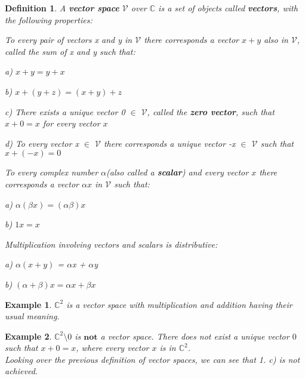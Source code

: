 \documentclass[12pt,a4paper]{article}
\newtheorem{defn}[thm]{Definition}
\newtheorem{exmp}{Example}[section]
\begin{document}
\begin{defn} A \textbf{vector space} $\mathcal{V}$ over $\mathbb{C}$ is a set of objects called \textbf{vectors}, with the following properties:
\item[1.] To every pair of vectors x and y in $\mathcal{V}$ there corresponds a vector $x + y$ also in $\mathcal{V}$, called the \textit{sum} of x and y such that:
\item \hspace{1cm} a) $x + y = y + x$
\item \hspace{1cm} b) $x + (y + z) = (x  + y) + z$
\item \hspace{1cm} c) There exists a unique vector 0 $\in$ $\mathcal{V}$, called the \textbf{zero vector}, such that $x + 0 = x $ for every vector $x$
\item \hspace{1cm} d) To every vector x $\in$ $\mathcal{V}$ there corresponds a unique vector -x $\in$ $\mathcal{V}$ such that $x + (-x) = 0$
\\
\item[2.] To every complex number $\alpha$(also called a \textbf{scalar}) and every vector $x$ there corresponds a vector $\alpha$$x$ in $\mathcal{V}$ such that:
\item \hspace{1cm} a) $\alpha(\beta x) = (\alpha\beta)x$
\item \hspace{1cm} b) $1x = x$
\\
\item[3.] Multiplication involving vectors and scalars is distributive:
\item \hspace{1cm} a) $\alpha$$(x + y)$ = $\alpha$x + $\alpha$y
\item \hspace{1cm} b) $(\alpha + \beta)x = \alpha x + \beta x$
\end{defn}
\begin{exmp}$\mathbb{C}^2$ is a vector space with multiplication and addition having their usual meaning.
\end{exmp}
\begin{exmp}$\mathbb{C}^2\setminus 0$ is $\textbf{not}$ a vector space. There does not exist a unique vector $0$ such that $x + 0 = x$, where every vector $x$ is in $\mathbb{C}^2$.\\
Looking over the previous definition of vector spaces, we can see that 1. c) is not achieved.
\end{exmp}
\end{document}

